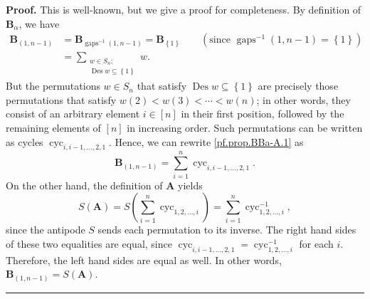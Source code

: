 \documentclass[12pt]{article}
\theoremstyle{definition}%
\theoremstyle{definition}%
\theoremstyle{remark}%
\newcommand{\tup}[1]{\left( #1 \right)}
\newcommand{\interval}[1]{\left[ #1 \right]} %
\newcommand{\set}[1]{\left\{ #1 \right\}}
\newcommand{\cyc}[1]{\operatorname{cyc}_{#1}}
\newcommand{\A}{\mathbf{A}}
\newcommand{\BB}{\mathbf{B}}
\newcommand{\BBa}{\mathbf{B}_{\alpha}}
\newcommand{\Des}{\operatorname{Des}}
\newcommand{\gaps}{\operatorname{gaps}}
\newenvironment{proof}[1][Proof]{\noindent\textbf{#1.} }{\ \rule{0.5em}{0.5em}}
\begin{document}
\begin{proof}
This is well-known, but we give a proof for completeness.
By definition of $\BBa$, we have
\begin{align}
\BB_{\tup{1, n-1}}
&= \BB_{\gaps^{-1}\tup{1, n-1}}
= \BB_{\set{1}}
\qquad \tup{\text{since }
\gaps^{-1}\tup{1, n-1} = \set{1}}
\nonumber\\
& =\sum_{\substack{w\in S_n;\\
\Des w\subseteq \set{1}}} w.
\label{pf.prop.BBa-A.1}
\end{align}
But the permutations $w\in S_n$ that satisfy $\Des %
w\subseteq \set{1}$ are precisely those permutations that satisfy
$w\tup{2} < w\tup{3} < \cdots < w\tup{n}$; in other
words, they consist of an arbitrary element $i\in \interval{n}$ in their
first position, followed by the remaining elements of $\interval{n}$ in
increasing order. Such permutations can be written as cycles
$\cyc{i,i-1,\ldots,2,1}$. Hence, we can rewrite
\eqref{pf.prop.BBa-A.1} as
\[
\BB_{\tup{1, n-1}}
=\sum_{i=1}^{n}\cyc{i,i-1,\ldots,2,1}.
\]
On the other hand, the definition of $\A$ yields
\[
S \tup{\A}
= S \tup{\sum_{i=1}^{n} \cyc{1,2,\ldots,i} }
= \sum_{i=1}^{n}\cyc{1,2,\ldots,i}^{-1},
\]
since the antipode $S$ sends each permutation to its inverse. The right hand
sides of these two equalities are equal, since
$\cyc{i,i-1,\ldots,2,1} = \cyc{1,2,\ldots,i}^{-1}$ for each
$i$. Therefore, the left hand sides are equal as well. In other words,
$\BB_{\tup{1, n-1}} = S\tup{\A}$.
\end{proof}
\end{document}
